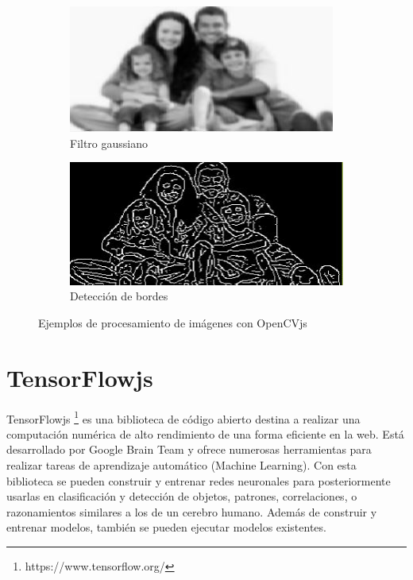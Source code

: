 \documentclass{report}
\begin{document}
\begin{figure}[h]
\begin{subfigure}{.5\textwidth}
  \centering
  \includegraphics[width=.7\linewidth]{images/blur.JPG}  
  \caption{Filtro gaussiano}
  \label{fig:sub-third}
\end{subfigure}
\begin{subfigure}{.5\textwidth}
  \centering
  \includegraphics[width=.7\linewidth]{images/bordes.JPG}  
  \caption{Detección de bordes}
  \label{fig:sub-fourth}
\end{subfigure}
\caption{Ejemplos de procesamiento de imágenes con OpenCVjs}
\label{fig:fig}
\end{figure}

\newpage
\section{TensorFlowjs}
TensorFlowjs \footnote{https://www.tensorflow.org/} \cite{TFjs} es una biblioteca de código abierto destina a realizar una computación numérica de alto rendimiento de una forma eficiente en la web. Está desarrollado por Google Brain Team y ofrece numerosas herramientas para realizar tareas de aprendizaje automático (Machine Learning). Con esta biblioteca se pueden construir y entrenar redes neuronales para posteriormente usarlas en clasificación y detección de objetos, patrones, correlaciones, o razonamientos similares a los de un cerebro humano. Además de construir y entrenar modelos, también se pueden ejecutar modelos existentes.
\\
\end{document}
